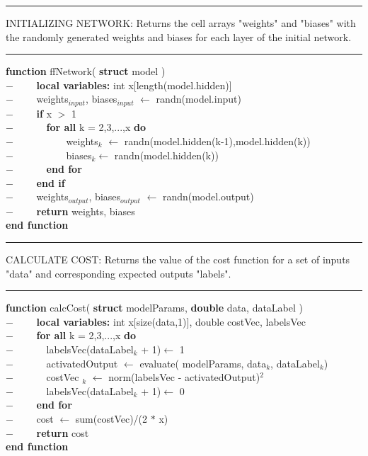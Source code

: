 \rule{\textwidth}{0.4pt}
INITIALIZING NETWORK: Returns the cell arrays "weights" and "biases" with the randomly generated weights and biases for each layer of the initial network.\\
\rule{\textwidth}{0.4pt}
\begin{addmargin}[2em]{0em}
\textbf{function} ffNetwork( \textbf{struct} model )\\
    $- \qquad$ \textbf{local variables:} int x[length(model.hidden)]\\
    $- \qquad$ weights$_{input}$, biases$_{input}$ $\leftarrow$ randn(model.input)\\
    $- \qquad$ \textbf{if} x $>$ 1\\
    $- \qquad \quad $ \textbf{for all} k = 2,3,...,x \textbf{do}\\
    $- \qquad \qquad \quad $ weights$_k$ $\leftarrow$ randn(model.hidden(k-1),model.hidden(k))\\
    $- \qquad \qquad \quad $ biases$_k$$\leftarrow$ randn(model.hidden(k))\\
    $- \qquad \quad $ \textbf{end for}\\
    $- \qquad $ \textbf{end if}\\
    $- \qquad$ weights$_{output}$, biases$_{output}$ $\leftarrow$ randn(model.output)\\
    $- \qquad$ \textbf{return} weights, biases\\
\textbf{end function}\\
\end{addmargin}
\rule{\textwidth}{0.4pt}
 CALCULATE COST: Returns the value of the cost function for a set of inputs "data" and corresponding expected outputs "labels".\\
\rule{\textwidth}{0.4pt}
\begin{addmargin}[2em]{0em}
\textbf{function} calcCost( \textbf{struct} modelParams, \textbf{double} data, dataLabel )\\
    $- \qquad$ \textbf{local variables:} int x[size(data,1)], double costVec, labelsVec\\
    $- \qquad $ \textbf{for all} k = 2,3,...,x \textbf{do}\\
    $- \qquad \quad $ labelsVec(dataLabel$_k$ + 1)$\leftarrow$ 1 \\ 
    $- \qquad \quad $ activatedOutput $\leftarrow$ evaluate( modelParams,  data$_{k}$, dataLabel$_{k}$)\\
    $- \qquad \quad $ costVec $_{k}$
    $\leftarrow$ norm(labelsVec - activatedOutput)$^2$\\
    $- \qquad \quad $ labelsVec(dataLabel$_k$ + 1)$\leftarrow$ 0 \\ 
    $- \qquad $ \textbf{end for}\\
    $- \qquad $ cost $\leftarrow$ sum(costVec)/(2 $*$ x)\\
    $- \qquad$ \textbf{return} cost\\
\textbf{end function}\\
\end{addmargin}

